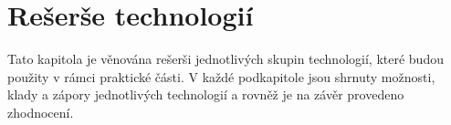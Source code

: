 \chapter{Rešerše technologií}

Tato kapitola je věnována rešerši jednotlivých skupin technologií,
které budou použity v rámci praktické části.
V každé podkapitole jsou shrnuty možnosti, klady a zápory jednotlivých
technologií
a rovněž je na závěr provedeno zhodnocení.







